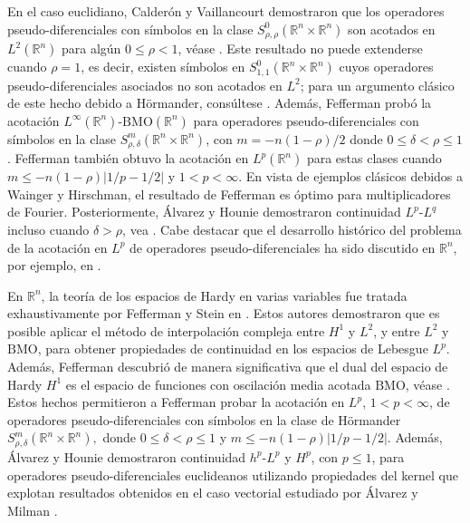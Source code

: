 En el caso euclidiano, Calderón y Vaillancourt demostraron que los operadores pseudo-diferenciales con símbolos en la clase $S^{0}_{\rho,\rho}(\mathbb{R}^n\times\mathbb{R}^n)$ son acotados en $L^2(\mathbb{R}^n)$ para algún $0\leq\rho<1$, véase \cite{calderon-vaillancourt-1, calderon-vaillancourt-2}. Este resultado no puede extenderse cuando $\rho=1$, es decir, existen símbolos en $S^{0}_{1,1}(\mathbb{R}^n\times\mathbb{R}^n)$ cuyos operadores pseudo-diferenciales asociados no son acotados en $L^2$; para un argumento clásico de este hecho debido a Hörmander, consúltese \cite{duoandikoetxea}. Además, Fefferman \cite{fefferman-Lp} probó la acotación $L^\infty(\mathbb{R}^n)$-$\mathrm{BMO}(\mathbb{R}^n)$ para operadores pseudo-diferenciales con símbolos en la clase $S^{m}_{\rho,\delta}(\mathbb{R}^n\times\mathbb{R}^n)$, con $m=-n(1-\rho)/2$ donde $0\leq \delta<\rho\leq 1$. Fefferman también obtuvo la acotación en $L^p(\mathbb{R}^n)$ para estas clases cuando $m\leq -n(1-\rho)|1/p - 1/2|$ y $1<p<\infty$. En vista de ejemplos clásicos debidos a Wainger y Hirschman, el resultado de Fefferman es óptimo para multiplicadores de Fourier. Posteriormente, Álvarez y Hounie demostraron continuidad $L^p$-$L^q$ incluso cuando $\delta>\rho$, vea \cite{alvarez-hounie}. Cabe destacar que el desarrollo histórico del problema de la acotación en $L^p$ de operadores pseudo-diferenciales ha sido discutido en $\mathbb{R}^n$, por ejemplo, en \cite{nagase, wang}.  

En $\mathbb{R}^n$, la teoría de los espacios de Hardy en varias variables fue tratada exhaustivamente por Fefferman y Stein en \cite{fefferman-stein}. Estos autores demostraron que es posible aplicar el método de interpolación compleja entre $H^1$ y $L^2$, y entre $L^2$ y $\mathrm{BMO}$, para obtener propiedades de continuidad en los espacios de Lebesgue $L^p$. Además, Fefferman descubrió de manera significativa que el dual del espacio de Hardy $H^1$ es el espacio de funciones con oscilación media acotada $\mathrm{BMO}$, véase \cite{fefferman-BMO}. Estos hechos permitieron a Fefferman probar la acotación en $L^p$, $1<p<\infty$, de operadores pseudo-diferenciales con símbolos en la clase de Hörmander $S^m_{\rho, \delta} (\mathbb{R}^n \times \mathbb{R}^n), $ donde $0\leq\delta<\rho\leq1$ y $m\leq-n(1-\rho)|1/p-1/2|$. Además, Álvarez y Hounie \cite{alvarez-hounie} demostraron continuidad $h^p$-$L^p$ y $H^p$, con $p\leq1$, para operadores pseudo-diferenciales euclideanos utilizando propiedades del kernel que explotan resultados obtenidos en el caso vectorial estudiado por Álvarez y Milman \cite{alvarez-milman}.

